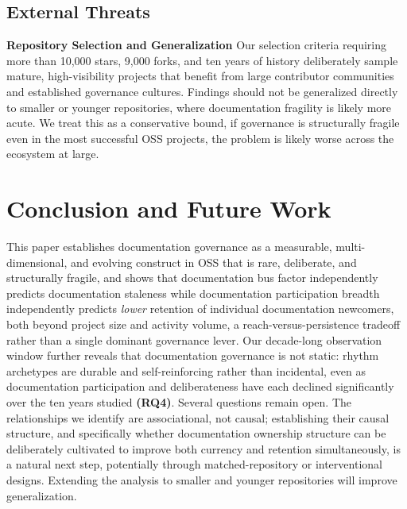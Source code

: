 \documentclass[10pt,conference]{IEEEtran}
\newcommand{\EAdejumo}[1]{\textcolor{red}{{\bfseries [[#1]]}}}
\begin{document}
{{\subsection{External Threats}
\textbf{Repository Selection and Generalization}
Our selection criteria requiring more than 10,000 stars, 9,000 forks, and ten years of history deliberately sample mature, high-visibility projects that benefit from large contributor communities and established governance cultures. Findings should not be generalized directly to smaller or younger repositories, where documentation fragility is likely more acute. We treat this as a conservative bound, if governance is structurally fragile even in the most successful OSS projects, the problem is likely
worse across the ecosystem at large. 




\section{Conclusion and Future Work}
\label{sec:conclusion}
This paper establishes documentation governance as a measurable, multi-dimensional, and evolving construct in OSS that is rare, deliberate, and structurally fragile, and shows that documentation bus factor independently predicts documentation staleness while documentation participation breadth independently predicts \textit{lower} retention of individual documentation newcomers, both beyond project size and activity volume, a reach-versus-persistence tradeoff rather than a single dominant governance lever. Our decade-long observation window further reveals that documentation governance is not static: rhythm archetypes are durable and self-reinforcing rather than incidental, even as documentation participation and deliberateness have each declined significantly over the ten years studied \textbf{(RQ4)}. Several questions remain open. The relationships we identify are associational, not causal; establishing their causal structure, and specifically whether documentation ownership structure can be deliberately cultivated to improve both currency and retention simultaneously, is a natural next step, potentially through matched-repository or interventional designs. Extending the analysis to smaller and younger repositories will improve generalization.

}}
\end{document}
